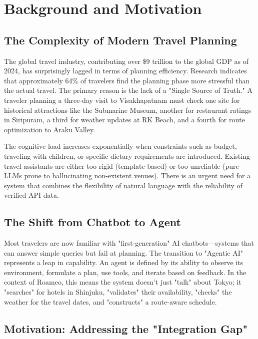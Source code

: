 \documentclass[12pt,a4paper]{report}
\begin{document}
\section{Background and Motivation}

\subsection{The Complexity of Modern Travel Planning}

The global travel industry, contributing over \$9 trillion to the global GDP as of 2024, has surprisingly lagged in terms of planning efficiency. Research indicates that approximately 64\% of travelers find the planning phase more stressful than the actual travel. The primary reason is the lack of a "Single Source of Truth." A traveler planning a three-day visit to Visakhapatnam must check one site for historical attractions like the Submarine Museum, another for restaurant ratings in Siripuram, a third for weather updates at RK Beach, and a fourth for route optimization to Araku Valley.

The cognitive load increases exponentially when constraints such as budget, traveling with children, or specific dietary requirements are introduced. Existing travel assistants are either too rigid (template-based) or too unreliable (pure LLMs prone to hallucinating non-existent venues). There is an urgent need for a system that combines the flexibility of natural language with the reliability of verified API data.

\subsection{The Shift from Chatbot to Agent}

Most travelers are now familiar with "first-generation" AI chatbots---systems that can answer simple queries but fail at planning. The transition to "Agentic AI" represents a leap in capability. An agent is defined by its ability to observe its environment, formulate a plan, use tools, and iterate based on feedback. In the context of Roameo, this means the system doesn't just "talk" about Tokyo; it "searches" for hotels in Shinjuku, "validates" their availability, "checks" the weather for the travel dates, and "constructs" a route-aware schedule.

\subsection{Motivation: Addressing the "Integration Gap"}
\end{document}
